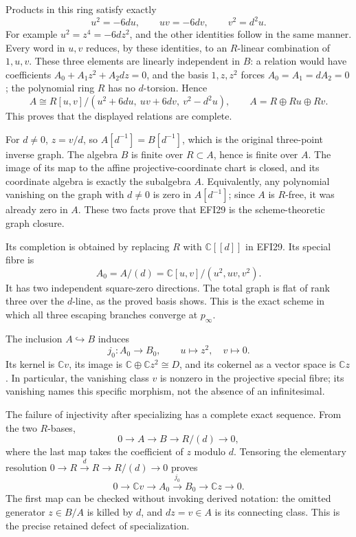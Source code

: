 \documentclass[
  10pt,
  a4paper,
]{article}
\begin{document}
Products in this ring satisfy exactly \[
u^2=-6du,\qquad uv=-6dv,\qquad v^2=d^2u.
\tag{EFI28}
\] For example \(u^2=z^4=-6dz^2\), and the other identities follow in
the same manner. Every word in \(u,v\) reduces, by these identities, to
an \(R\)-linear combination of \(1,u,v\). These three elements are
linearly independent in \(B\): a relation would have coefficients
\(A_0+A_1z^2+A_2dz=0\), and the basis \(1,z,z^2\) forces
\(A_0=A_1=dA_2=0\); the polynomial ring \(R\) has no \(d\)-torsion.
Hence \[
A\cong
R[u,v]/(u^2+6du,\ uv+6dv,\ v^2-d^2u),
\qquad A=R\oplus Ru\oplus Rv.
\tag{EFI29}
\] This proves that the displayed relations are complete.

For \(d\ne0\), \(z=v/d\), so \(A[d^{-1}]=B[d^{-1}]\), which is the
original three-point inverse graph. The algebra \(B\) is finite over
\(R\subset A\), hence is finite over \(A\). The image of its map to the
affine projective-coordinate chart is closed, and its coordinate algebra
is exactly the subalgebra \(A\). Equivalently, any polynomial vanishing
on the graph with \(d\ne0\) is zero in \(A[d^{-1}]\); since \(A\) is
\(R\)-free, it was already zero in \(A\). These two facts prove that
EFI29 is the scheme-theoretic graph closure.

Its completion is obtained by replacing \(R\) with \(\mathbb C[[d]]\) in
EFI29. Its special fibre is \[
A_0=A/(d)=\mathbb C[u,v]/(u^2,uv,v^2).
\tag{EFI30}
\] It has two independent square-zero directions. The total graph is
flat of rank three over the \(d\)-line, as the proved basis shows. This
is the exact scheme in which all three escaping branches converge at
\(p_\infty\).

The inclusion \(A\hookrightarrow B\) induces \[
j_0:A_0\longrightarrow B_0,\qquad
u\longmapsto z^2,\quad v\longmapsto0.
\tag{EFI31}
\] Its kernel is \(\mathbb C v\), its image is
\(\mathbb C\oplus\mathbb C z^2\cong D\), and its cokernel as a vector
space is \(\mathbb C z\). In particular, the vanishing class \(v\) is
nonzero in the projective special fibre; its vanishing names this
specific morphism, not the absence of an infinitesimal.

The failure of injectivity after specializing has a complete exact
sequence. From the two \(R\)-bases, \[
0\longrightarrow A\longrightarrow B\longrightarrow R/(d)
\longrightarrow0,
\tag{EFI32}
\] where the last map takes the coefficient of \(z\) modulo \(d\).
Tensoring the elementary resolution
\(0\to R\xrightarrow{d}R\to R/(d)\to0\) proves \[
0\longrightarrow\mathbb C v\longrightarrow A_0
\xrightarrow{j_0}B_0\longrightarrow\mathbb C z\longrightarrow0.
\tag{EFI33}
\] The first map can be checked without invoking derived notation: the
omitted generator \(z\in B/A\) is killed by \(d\), and \(dz=v\in A\) is
its connecting class. This is the precise retained defect of
specialization.
\end{document}

